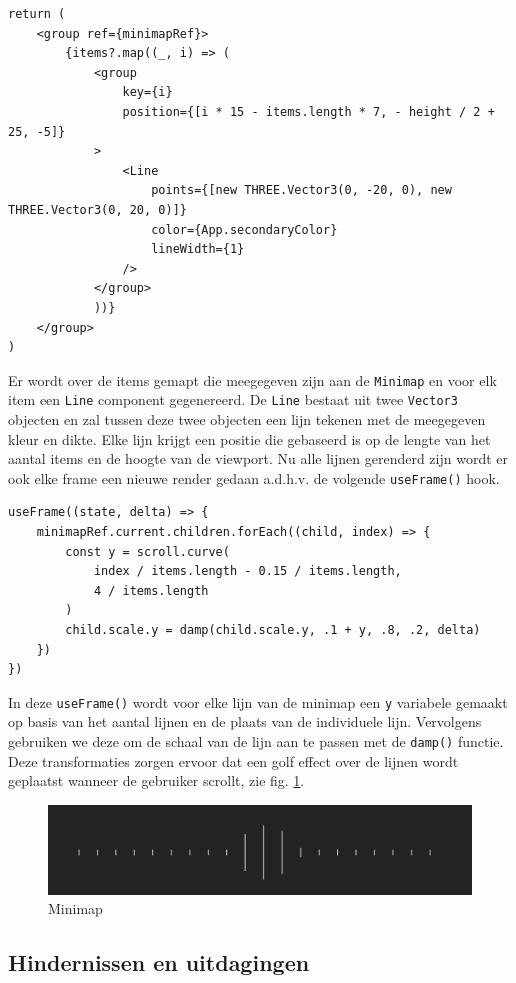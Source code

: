 \begin{lstlisting}
return (
	<group ref={minimapRef}>
		{items?.map((_, i) => (
			<group 
				key={i} 
				position={[i * 15 - items.length * 7, - height / 2 + 25, -5]}
			>
				<Line 
					points={[new THREE.Vector3(0, -20, 0), new THREE.Vector3(0, 20, 0)]} 
					color={App.secondaryColor} 
					lineWidth={1}
				/>
			</group>
			))}
	</group>
)
\end{lstlisting}

Er wordt over de items gemapt die meegegeven zijn aan de \texttt{Minimap} en voor elk item een \texttt{Line} component gegenereerd. De \texttt{Line} bestaat uit twee \texttt{Vector3} objecten en zal tussen deze twee objecten een lijn tekenen met de meegegeven kleur en dikte. Elke lijn krijgt een positie die gebaseerd is op de lengte van het aantal items en de hoogte van de viewport.
Nu alle lijnen gerenderd zijn wordt er ook elke frame een nieuwe render gedaan a.d.h.v. de volgende \texttt{useFrame()} hook.

\begin{lstlisting}
useFrame((state, delta) => {
	minimapRef.current.children.forEach((child, index) => {
		const y = scroll.curve(
			index / items.length - 0.15 / items.length,
			4 / items.length
		)
		child.scale.y = damp(child.scale.y, .1 + y, .8, .2, delta)
	})
})
\end{lstlisting}

In deze \texttt{useFrame()} wordt voor elke lijn van de minimap een \texttt{y} variabele gemaakt op basis van het aantal lijnen en de plaats van de individuele lijn. Vervolgens gebruiken we deze om de schaal van de lijn aan te passen met de \texttt{damp()} functie. Deze transformaties zorgen ervoor dat een golf effect over de lijnen wordt geplaatst wanneer de gebruiker scrollt, zie fig. \ref{fig:minimap}.

\begin{figure}[h]
	\centering
	\includegraphics[width=1\linewidth]{graphics/minimap}
	\caption[Minimap]{Minimap}
	\label{fig:minimap}
\end{figure}

\subsection{Hindernissen en uitdagingen}

